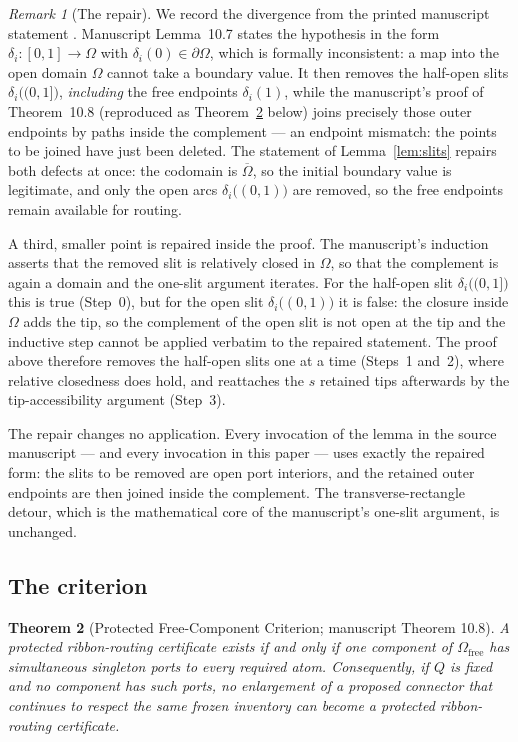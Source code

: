 \documentclass[11pt,reqno]{amsart}
\newtheorem{theorem}{Theorem}[section]
\theoremstyle{definition}
\theoremstyle{remark}
\newtheorem{remark}[theorem]{Remark}
\newcommand{\Omfree}{\Omega_{\mathrm{free}}}
\begin{document}
\begin{remark}[The repair]\label{rem:repair}
We record the divergence from the printed manuscript statement \cite{MWman}. Manuscript
Lemma~10.7 states the hypothesis in the form
$\delta_i\colon[0,1]\to\Omega$ with $\delta_i(0)\in\partial\Omega$, which is formally
inconsistent: a map into the open domain $\Omega$ cannot take a boundary value. It then
removes the half-open slits $\delta_i\bigl((0,1]\bigr)$, \emph{including} the free
endpoints $\delta_i(1)$, while the manuscript's proof of Theorem~10.8 (reproduced as
Theorem~\ref{thm:free-component} below) joins precisely those outer endpoints by paths
inside the complement --- an endpoint mismatch: the points to be joined have just been
deleted. The statement of Lemma~\ref{lem:slits} repairs both defects at once: the
codomain is $\overline{\Omega}$, so the initial boundary value is legitimate, and only
the open arcs $\delta_i\bigl((0,1)\bigr)$ are removed, so the free endpoints remain
available for routing.

A third, smaller point is repaired inside the proof. The manuscript's induction asserts
that the removed slit is relatively closed in $\Omega$, so that the complement is again
a domain and the one-slit argument iterates. For the half-open slit
$\delta_i\bigl((0,1]\bigr)$ this is true (Step~0), but for the open slit
$\delta_i\bigl((0,1)\bigr)$ it is false: the closure inside $\Omega$ adds the tip, so
the complement of the open slit is not open at the tip and the inductive step cannot be
applied verbatim to the repaired statement. The proof above therefore removes the
half-open slits one at a time (Steps~1 and~2), where relative closedness does hold, and
reattaches the $s$ retained tips afterwards by the tip-accessibility argument (Step~3).

The repair changes no application. Every invocation of the lemma in the source
manuscript --- and every invocation in this paper --- uses exactly the repaired form:
the slits to be removed are open port interiors, and the retained outer endpoints are
then joined inside the complement. The transverse-rectangle detour, which is the
mathematical core of the manuscript's one-slit argument, is unchanged.
\end{remark}

\subsection{The criterion}\label{subsec:D-criterion}

\begin{theorem}[Protected Free-Component Criterion; manuscript Theorem 10.8]
\label{thm:free-component}
A protected ribbon-routing certificate exists if and only if one component of $\Omfree$
has simultaneous singleton ports to every required atom.  Consequently, if
$Q$ is fixed and no component has such ports, no enlargement of a proposed
connector that continues to respect the same frozen inventory can become a
protected ribbon-routing certificate.
\end{theorem}
\end{document}
